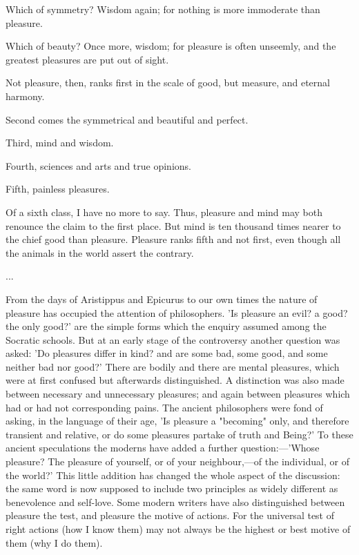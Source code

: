 \documentclass[11pt,letter]{article}
\begin{document}
\par  Which of symmetry? Wisdom again; for nothing is more immoderate than pleasure.

\par  Which of beauty? Once more, wisdom; for pleasure is often unseemly, and the greatest pleasures are put out of sight.

\par  Not pleasure, then, ranks first in the scale of good, but measure, and eternal harmony.

\par  Second comes the symmetrical and beautiful and perfect.

\par  Third, mind and wisdom.

\par  Fourth, sciences and arts and true opinions.

\par  Fifth, painless pleasures.

\par  Of a sixth class, I have no more to say. Thus, pleasure and mind may both renounce the claim to the first place. But mind is ten thousand times nearer to the chief good than pleasure. Pleasure ranks fifth and not first, even though all the animals in the world assert the contrary.

\par  ...

\par  From the days of Aristippus and Epicurus to our own times the nature of pleasure has occupied the attention of philosophers. 'Is pleasure an evil? a good? the only good?' are the simple forms which the enquiry assumed among the Socratic schools. But at an early stage of the controversy another question was asked: 'Do pleasures differ in kind? and are some bad, some good, and some neither bad nor good?' There are bodily and there are mental pleasures, which were at first confused but afterwards distinguished. A distinction was also made between necessary and unnecessary pleasures; and again between pleasures which had or had not corresponding pains. The ancient philosophers were fond of asking, in the language of their age, 'Is pleasure a "becoming" only, and therefore transient and relative, or do some pleasures partake of truth and Being?' To these ancient speculations the moderns have added a further question:—'Whose pleasure? The pleasure of yourself, or of your neighbour,—of the individual, or of the world?' This little addition has changed the whole aspect of the discussion: the same word is now supposed to include two principles as widely different as benevolence and self-love. Some modern writers have also distinguished between pleasure the test, and pleasure the motive of actions. For the universal test of right actions (how I know them) may not always be the highest or best motive of them (why I do them).
\end{document}
